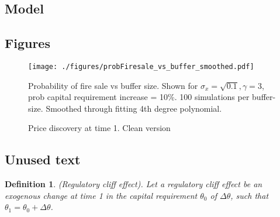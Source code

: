 \documentclass[11pt]{article}
\newtheorem{definition}{Definition}%
\begin{document}
\clearpage


\newpage
\begin{appendices}


\section{Model}

\subsection{Figures}

\begin{figure}[h]
\centering
\texttt{[image: ./figures/probFiresale\_vs\_buffer\_smoothed.pdf]}
\caption{Probability of fire sale vs buffer size. Shown for $\sigma_x = \sqrt{0.1}, \gamma = 3$, prob capital requirement increase = 10\%. 100 simulations per buffer-size. Smoothed through fitting 4th degree polynomial.}
\label{f_probFSvsBufferAppendix}
\end{figure}

\begin{figure}[h]
\centering
{}
\caption{Price discovery at time 1. Clean version}
\label{fig:t1pricediscClean}
\end{figure}

\newpage
\subsection{Unused text}

\begin{definition} (Regulatory cliff effect).
Let a regulatory cliff effect be an exogenous change at time 1 in the capital requirement $\theta_0$ of $\Delta \theta$, such that $\theta_1 = \theta_0 + \Delta \theta$. 
\end{definition}


\end{appendices}
\end{document}
